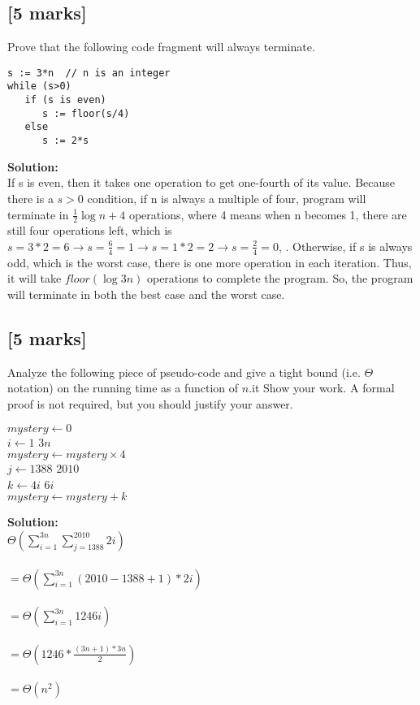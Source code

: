 \documentclass[12pt]{article}
\begin{document}
\subsection{[5 marks]}
Prove that the following code fragment will always terminate.
\begin{verbatim}
s := 3*n  // n is an integer
while (s>0)
   if (s is even)
      s := floor(s/4)
   else
      s := 2*s
\end{verbatim}
\textbf{Solution:}
\\If s is even, then it takes one operation to get one-fourth of its value. Because there is a $s>0$ condition, if n is always a multiple of four, program will terminate in $\frac{1}{2} \log {n} + 4$ operations, where 4 means when n becomes 1, there are still four operations left, which is $s = 3 * 2 = 6 \rightarrow s = \frac{6}{4} = 1 \rightarrow s = 1*2 = 2 \rightarrow s = \frac{2}{4} = 0$, . Otherwise, if s is always odd, which is the worst case, there is one more operation in each iteration. Thus, it will take $floor(\log{3n})$ operations to complete the program. So, the program will terminate in both the best case and the worst case.
\subsection{[5 marks]}
Analyze the following piece of pseudo-code and give a tight bound
(i.e. $\Theta$ notation) on the running time as a function of $n$.it 
Show your work. A formal proof is not required, but you should
justify your answer.
  \begin{algorithme}
        \lign $mystery \leftarrow 0$\\ 
        \lign {} $i \leftarrow 1$  $3n$ \\
	\lign \>$mystery \leftarrow mystery\times 4$\\
        \lign \>  $j \leftarrow 1388$  $2010$ \\
        \lign \>\>  $k \leftarrow 4i$  $6i$ \\
        \lign \> \>\> $mystery \leftarrow mystery+k$
  \end{algorithme}
\textbf{Solution:}
\\$\Theta{(\sum_{i=1}^{3n} \sum_{j=1388}^{2010} 2i)} $
\\
\\$= \Theta(\sum_{i=1}^{3n} (2010-1388+1)*2i)$
\\
\\$= \Theta(\sum_{i=1}^{3n} 1246i)$
\\
\\$=\Theta(1246* \frac{(3n+1)*3n}{2})$
\\
\\$=\Theta(n^2)$
\end{document}

